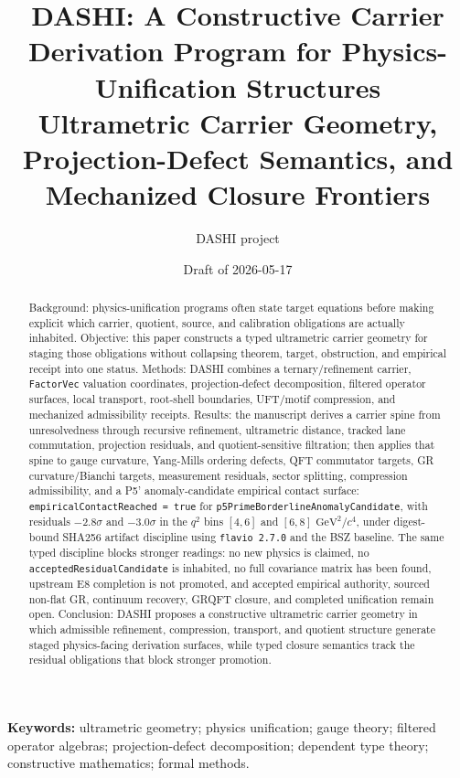 \documentclass[11pt]{article}
\title{DASHI: A Constructive Carrier Derivation Program for Physics-Unification Structures\\
\large Ultrametric Carrier Geometry, Projection-Defect Semantics, and Mechanized Closure Frontiers}
\author{DASHI project}
\date{Draft of 2026-05-17}
\theoremstyle{definition}
\theoremstyle{plain}
\theoremstyle{remark}
\begin{document}
\sloppy
\maketitle

\begin{abstract}
Background: physics-unification programs often state target equations before
making explicit which carrier, quotient, source, and calibration obligations
are actually inhabited. Objective: this paper constructs a typed ultrametric
carrier geometry for staging those obligations without collapsing theorem,
target, obstruction, and empirical receipt into one status. Methods: DASHI
combines a ternary/refinement carrier, \texttt{FactorVec} valuation
coordinates, projection-defect decomposition, filtered operator surfaces, local
transport, root-shell boundaries, UFT/motif compression, and mechanized
admissibility receipts. Results: the manuscript derives a carrier spine from
unresolvedness through recursive refinement, ultrametric distance, tracked lane
commutation, projection residuals, and quotient-sensitive filtration; then
applies that spine to gauge curvature, Yang-Mills ordering defects, QFT
commutator targets, GR curvature/Bianchi targets, measurement residuals,
sector splitting, compression admissibility, and a P5' anomaly-candidate
empirical contact surface: \texttt{empiricalContactReached = true} for
\texttt{p5PrimeBorderlineAnomalyCandidate}, with residuals \(-2.8\sigma\)
and \(-3.0\sigma\) in the \(q^2\) bins \([4,6]\) and \([6,8]\)
\(\mathrm{GeV}^2/c^4\), under digest-bound SHA256 artifact discipline using
\texttt{flavio 2.7.0} and the BSZ baseline. The same typed discipline blocks
stronger readings: no new physics is claimed, no
\texttt{acceptedResidualCandidate} is inhabited, no full covariance matrix has
been found, upstream E8 completion is not promoted, and accepted empirical
authority, sourced non-flat GR, continuum recovery, GRQFT closure, and
completed unification remain open. Conclusion: DASHI proposes a constructive
ultrametric carrier geometry in which admissible refinement, compression,
transport, and quotient structure generate staged physics-facing derivation
surfaces, while typed closure semantics track the residual obligations that
block stronger promotion.
\end{abstract}

\noindent\textbf{Keywords:} ultrametric geometry; physics unification; gauge
theory; filtered operator algebras; projection-defect decomposition; dependent
type theory; constructive mathematics; formal methods.
\end{document}
